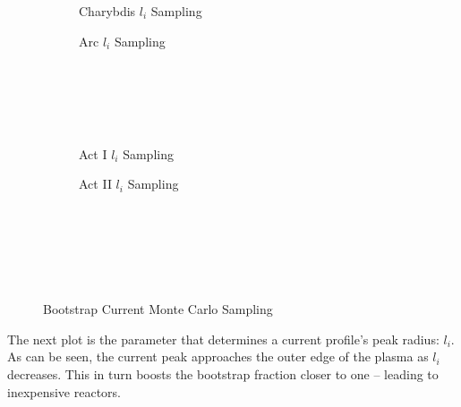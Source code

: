 \begin{figure*}
    \centering
    \hfill 
    \begin{subfigure}[t]{0.45\textwidth}
        \centering
		\begin{adjustbox}{width=\textwidth}
			\Large
			
		\end{adjustbox}
        \caption{Charybdis $l_i$ Sampling}
    \end{subfigure}
    \hfill
    \begin{subfigure}[t]{0.45\textwidth}
        \centering
		\begin{adjustbox}{width=\textwidth}
			\Large
			
		\end{adjustbox}
        \caption{Arc $l_i$ Sampling}
    \end{subfigure}
    \hfill \hfill ~\\ ~\\ ~\\ ~\\
    \hfill 
    \begin{subfigure}[t]{0.45\textwidth}
        \centering
		\begin{adjustbox}{width=\textwidth}
			\Large
			
		\end{adjustbox}
        \caption{Act I $l_i$ Sampling}
    \end{subfigure}
    \hfill
    \begin{subfigure}[t]{0.45\textwidth}
        \centering
		\begin{adjustbox}{width=\textwidth}
			\Large
			
		\end{adjustbox}
        \caption{Act II $l_i$ Sampling}
    \end{subfigure}	
    \hfill \hfill ~\\ ~\\ ~\\
    \caption{Bootstrap Current Monte Carlo Sampling}
    \label{fig:bootstrap_samplings} ~ \\
\end{figure*}

The next plot  is the parameter that determines a current profile's peak radius: $l_i$. As can be seen, the current peak approaches the outer edge of the plasma as $l_i$ decreases. This in turn boosts the bootstrap fraction closer to one -- leading to inexpensive reactors.

